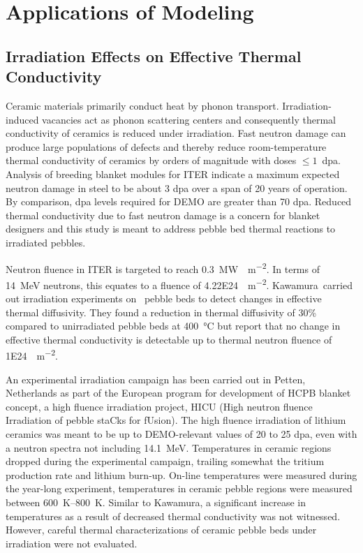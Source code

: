 \chapter{Applications of Modeling}\label{sec:dem-studies}




\section{Irradiation Effects on Effective Thermal Conductivity}\label{sec:irradiation}
Ceramic materials primarily conduct heat by phonon transport. Irradiation-induced vacancies act as phonon scattering centers and consequently thermal conductivity of ceramics is reduced under irradiation.\cite{Hopkins1985} Fast neutron damage can produce large populations of defects and thereby reduce room-temperature thermal conductivity of ceramics by orders of magnitude with doses $\le 1$~dpa.\cite{Snead2005} Analysis of breeding blanket modules for ITER indicate a maximum expected neutron damage in steel to be about 3 dpa over a span of 20 years of operation. By comparison, dpa levels required for DEMO are greater than 70 dpa.\cite{Giancarli2006a} Reduced thermal conductivity due to fast neutron damage is a concern for blanket designers and this study is meant to address pebble bed thermal reactions to irradiated pebbles.

Neutron fluence in ITER is targeted to reach \SI{0.3}{\mega\watt\year\per\square\meter}.\cite{Abdou2015,VanHoutte2011} In terms of \SI{14}{\mega\electronvolt} neutrons, this equates to a fluence of \SI{4.22E24}{\neutron\per\meter\squared}. Kawamura\etal~carried out irradiation experiments on \lit~pebble beds to detect changes in effective thermal diffusivity. They found a reduction in thermal diffusivity of 30\% compared to unirradiated pebble beds at \SI{400}{\celsius} but report that no change in effective thermal conductivity is detectable up to thermal neutron fluence of \SI{1E24}{\neutron\per\meter\squared}. 

An experimental irradiation campaign has been carried out in Petten, Netherlands as part of the European program for development of HCPB blanket concept, a high fluence irradiation project, HICU (High neutron fluence Irradiation of pebble staCks for fUsion). The high fluence irradiation of lithium ceramics was meant to be up to DEMO-relevant values of 20 to 25 dpa, even with a neutron spectra not including \SI{14.1}{\mega\electronvolt}.\cite{Hegeman2003,VanTil2012} Temperatures in ceramic regions dropped during the experimental campaign, trailing somewhat the tritium production rate and lithium burn-up. On-line temperatures were measured during the year-long experiment, temperatures in ceramic pebble regions were measured between \SIrange{600}{800}{\kelvin}. Similar to Kawamura\etal, a significant increase in temperatures as a result of decreased thermal conductivity was not witnessed. However, careful thermal characterizations of ceramic pebble beds under irradiation were not evaluated.

